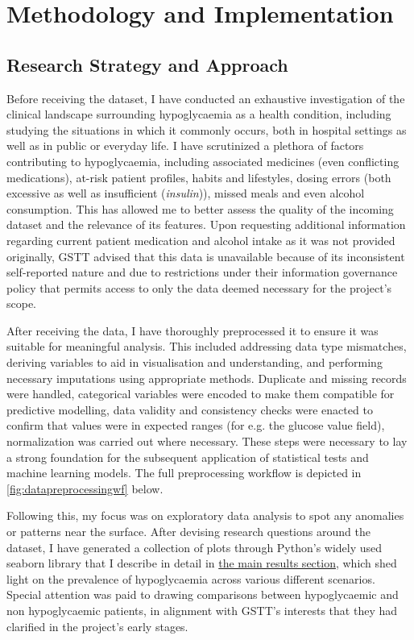 \section{Methodology and Implementation}

	\subsection{Research Strategy and Approach}
	\noindent Before receiving the dataset, I have conducted an exhaustive investigation of the clinical landscape surrounding hypoglycaemia as a health condition, including studying the situations in which it commonly occurs, both in hospital settings as well as in public or everyday life. I have scrutinized a plethora of factors contributing to hypoglycaemia, including associated medicines (even conflicting medications), at-risk patient profiles, habits and lifestyles, dosing errors (both excessive as well as insufficient (\textit{insulin})), missed meals and even alcohol consumption. This has allowed me to better assess the quality of the incoming dataset and the relevance of its features. Upon requesting additional information regarding current patient medication and alcohol intake as it was not provided originally, GSTT advised that this data is unavailable because of its inconsistent self-reported nature and due to restrictions under their information governance policy that permits access to only the data deemed necessary for the project's scope.

	\vspace{10pt}
	\noindent After receiving the data, I have thoroughly preprocessed it to ensure it was suitable for meaningful analysis. This included addressing data type mismatches, deriving variables to aid in visualisation and understanding, and performing necessary imputations using appropriate methods. Duplicate and missing records were handled, categorical variables were encoded to make them compatible for predictive modelling, data validity and consistency checks were enacted to confirm that values were in expected ranges (for e.g. the glucose value field), normalization was carried out where necessary. These steps were necessary to lay a strong foundation for the subsequent application of statistical tests and machine learning models. The full preprocessing workflow is depicted in \autoref{fig:datapreprocessingwf} below. \
	
	\vspace{10pt}
	\noindent Following this, my focus was on exploratory data analysis to spot any anomalies or patterns near the surface. After devising research questions around the dataset, I have generated a collection of plots through Python's widely used seaborn library that I describe in detail in \hyperref[sec:mainResults]{the main results section}, which shed light on the prevalence of hypoglycaemia across various different scenarios. Special attention was paid to drawing comparisons between hypoglycaemic and non hypoglycaemic patients, in alignment with GSTT's interests that they had clarified in the project's early stages.

